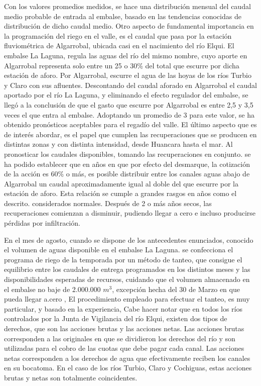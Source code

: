 \documentclass[11pt,]{article}
\begin{document}
Con los valores promedios medidos, se hace una distribución mensual del caudal medio probable de entrada al embalse, basado en las tendencias conocidas de distribución de dicho caudal medio. Otro aspecto de fundamental importancia en la programación del riego en el valle, es el caudal que pasa por la estación fluviométrica de Algarrobal, ubicada casi en el nacimiento del río Elqui. El embalse La Laguna, regula las aguas del río del mismo nombre, cuyo aporte en Algarrobal representa solo entre un 25 o 30\% del total que escurre por dicha estación de aforo. Por Algarrobal, escurre el agua de las hoyas de los ríos Turbio y Claro con sus afluentes. Descontando del caudal aforado en Algarrobal el caudal aportado por el río La Laguna, y eliminando el efecto regulador del embalse, se llegó a la conclusión de que el gasto que escurre por Algarrobal es entre 2,5 y 3,5 veces el que entra al embalse. Adoptando un promedio de 3 para este valor, se ha obtenido pronósticos aceptables para el regadío del valle. El último aspecto que es de interés abordar, es el papel que cumplen las recuperaciones que se producen en distintas zonas y con distinta intensidad, desde Huancara hasta el mar. Al pronosticar los caudales disponibles, tomando las recuperaciones en conjunto. se ha podido establecer que en años en que por efecto del desmarque, la cotización de la acción es 60\% o más, es posible distribuir entre los canales aguas abajo de Algarrobal un caudal aproximadamente igual al doble del que escurre por la estación de aforo. Esta relación se cumple a grandes rasgos en años como el descrito. considerados normales. Después de 2 o más años secos, las recuperaciones comienzan a disminuir, pudiendo llegar a cero e incluso producirse pérdidas por infiltración.\bigskip

En el mes de agosto, cuando se dispone de los antecedentes enunciados, conocido el volumen de aguas disponible en el embalse La Laguna. se confecciona el programa de riego de la temporada por un método de tanteo, que consigue el equilibrio entre los caudales de entrega programados en los distintos meses y las disponibilidades esperadas de recursos, cuidando que el volumen almacenado en el embalse no baje de 2.000.000 $m^3$, excepción hecha del 30 de Marzo en que pueda llegar a.cero , El procedimiento empleado para efectuar el tanteo, es muy particular, y basado en la experiencia, Cabe hacer notar que en todos los ríos  controlados por la Junta de Vigilancia del río Elqui, existen dos tipos de derechos, que son las acciones brutas y las acciones netas. Las acciones brutas corresponden a las originales en que se dividieron los derechos del río y son utilizadas para el cobro de las cuotas que debe pagar cada canal. Las acciones netas corresponden a los derechos de agua que efectivamente reciben los canales en su bocatoma. En el caso de los ríos Turbio, Claro y Cochiguas, estas acciones brutas y netas son totalmente coincidentes.\bigskip
\end{document}
